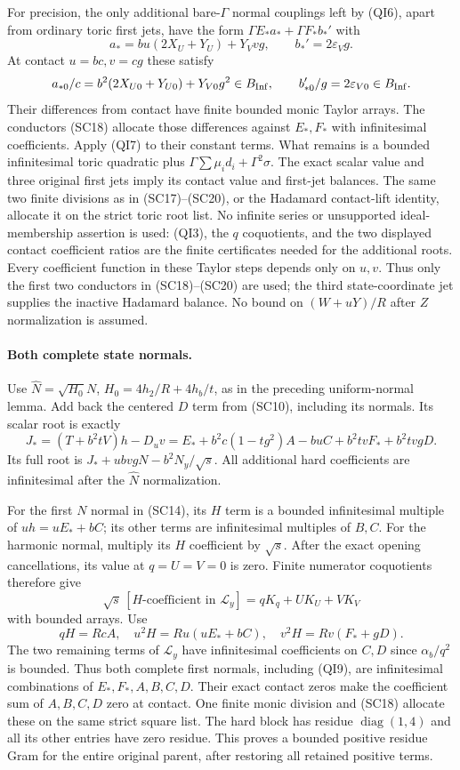 For precision, the only additional bare-$\Gamma$ normal couplings
left by (QI6), apart from ordinary toric first jets, have the form
$\Gamma E_*a_*+\Gamma F_*b_*'$ with
\[
 a_*=bu(2X_U+Y_U)+Y_Vvg,
 \qquad b_*'=2\varepsilon_Vg.
\]
At contact $u=bc,v=cg$ these satisfy
\[
 a_{*0}/c=b^2(2X_{U0}+Y_{U0})+Y_{V0}g^2\in B_{\rm Inf},
 \qquad b_{*0}'/g=2\varepsilon_{V0}\in B_{\rm Inf}.
\]
Their differences from contact have finite bounded monic Taylor
arrays. The conductors (SC18) allocate those differences against
$E_*,F_*$ with infinitesimal coefficients. Apply (QI7) to their
constant terms. What remains is a bounded infinitesimal toric
quadratic plus $\Gamma\sum\mu_i d_i+\Gamma^2\sigma$.
The exact scalar value and three original first jets imply its
contact value and first-jet balances. The same two finite divisions
as in (SC17)--(SC20), or the Hadamard contact-lift identity, allocate
it on the strict toric root list. No infinite series or unsupported
ideal-membership assertion is used: (QI3), the $q$ coquotients,
and the two displayed contact coefficient ratios are the finite
certificates needed for the additional roots.
Every coefficient function in these Taylor steps depends only on
$u,v$. Thus only the first two conductors in (SC18)--(SC20) are
used; the third state-coordinate jet supplies the inactive Hadamard
balance. No bound on $(W+uY)/R$ after $Z$ normalization is assumed.

\paragraph{Both complete state normals.}
Use $\widehat N=\sqrt{H_0}N$, $H_0=4h_2/R+4h_b/t$, as in the
preceding uniform-normal lemma. Add back the centered $D$ term
from (SC10), including its normals. Its scalar root is exactly
\[
 J_*=(T+b^2tV)h-D_uv
 =E_*+b^2c(1-tg^2)A-buC+b^2tvF_*+b^2tvgD.
 \tag{QI9}
\]
Its full root is $J_*+ubvgN-b^2N_y/\sqrt s$.
All additional hard coefficients are infinitesimal after the
$\widehat N$ normalization.

For the first $N$ normal in (SC14), its $H$ term is a bounded
infinitesimal multiple of $u h=uE_*+bC$; its other terms are
infinitesimal multiples of $B,C$. For the harmonic normal, multiply
its $H$ coefficient by $\sqrt s$. After the exact opening
cancellations, its value at $q=U=V=0$ is zero. Finite numerator
coquotients therefore give
\[
 \sqrt s\,[H\text{-coefficient in }\mathcal L_y]
       =qK_q+UK_U+VK_V
 \tag{QI10}
\]
with bounded arrays. Use
\[
 qH=RcA,\quad u^2H=Ru(uE_*+bC),\quad
 v^2H=Rv(F_*+gD).
\]
The two remaining terms of $\mathcal L_y$ have infinitesimal
coefficients on $C,D$ since $\alpha_b/q^2$ is bounded. Thus both
complete first normals, including (QI9), are infinitesimal
combinations of $E_*,F_*,A,B,C,D$. Their exact contact zeros make
the coefficient sum of $A,B,C,D$ zero at contact. One finite monic
division and (SC18) allocate these on the same strict square list.
The hard block has residue $\operatorname{diag}(1,4)$ and all its
other entries have zero residue. This proves a bounded positive
residue Gram for the entire original parent, after restoring all
retained positive terms.

